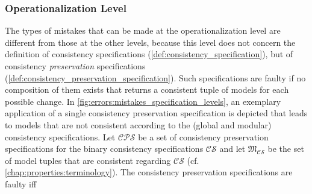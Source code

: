 \subsubsection{Operationalization Level}
The types of mistakes that can be made at the operationalization level are different from those at the other levels, because this level does not concern the definition of consistency specifications (\autoref{def:consistency_specification}), but of consistency \emph{preservation} specifications (\autoref{def:consistency_preservation_specification}).
Such specifications are faulty if no composition of them exists that returns a consistent tuple of models for each possible change. %
In \autoref{fig:errors:mistakes_specification_levels}, an exemplary application of a single consistency preservation specification is depicted that leads to models that are not consistent according to the (global and modular) consistency specifications.
Let $\mathcal{CPS}$ be a set of consistency preservation specifications  %
for the binary consistency specifications $\mathcal{CS}$ %
and
let $\mathfrak{M}_{\mathcal{CS}}$ be the set of model tuples that are consistent regarding $\mathcal{CS}$ (cf. \autoref{chap:properties:terminology}). 
The consistency preservation specifications are faulty iff
